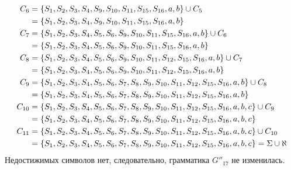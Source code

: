 \begin{itemize}
\begin{align*}
		      C_{6}  & = \left\{S_1, S_2, S_3, S_4, S_9, S_{10}, S_{11}, S_{15}, S_{16}, a, b\right\} \cup C_{5}                                          \\
		             & = \left\{S_1, S_2, S_3, S_4, S_9, S_{10}, S_{11}, S_{15}, S_{16}, a, b\right\}                                                     \\
		      C_{7}  & = \left\{S_1, S_2, S_3, S_4, S_5, S_6, S_9, S_{10}, S_{11}, S_{15}, S_{16}, a, b\right\} \cup C_{6}                                \\
		             & = \left\{S_1, S_2, S_3, S_4, S_5, S_6, S_9, S_{10}, S_{11}, S_{15}, S_{16}, a, b\right\}                                           \\
		      C_{8}  & = \left\{S_1, S_2, S_3, S_4, S_5, S_6, S_9, S_{10}, S_{11}, S_{12}, S_{15}, S_{16}, a, b\right\} \cup C_{7}                        \\
		             & = \left\{S_1, S_2, S_3, S_4, S_5, S_6, S_9, S_{10}, S_{11}, S_{12}, S_{15}, S_{16}, a, b\right\}                                   \\
		      C_{9}  & = \left\{S_1, S_2, S_3, S_4, S_5, S_6, S_7, S_8, S_9, S_{10}, S_{11}, S_{12}, S_{15}, S_{16}, a, b\right\} \cup C_{8}              \\
		             & = \left\{S_1, S_2, S_3, S_4, S_5, S_6, S_7, S_8, S_9, S_{10}, S_{11}, S_{12}, S_{15}, S_{16}, a, b\right\}                         \\
		      C_{10} & = \left\{S_1, S_2, S_3, S_4, S_5, S_6, S_7, S_8, S_9, S_{10}, S_{11}, S_{12}, S_{15}, S_{16}, a, b, c\right\} \cup C_{9}           \\
		             & = \left\{S_1, S_2, S_3, S_4, S_5, S_6, S_7, S_8, S_9, S_{10}, S_{11}, S_{12}, S_{15}, S_{16}, a, b, c\right\}                      \\
		      C_{11} & = \left\{S_1, S_2, S_3, S_4, S_5, S_6, S_7, S_8, S_9, S_{10}, S_{11}, S_{12}, S_{15}, S_{16}, a, b, c\right\} \cup C_{10}          \\
		             & = \left\{S_1, S_2, S_3, S_4, S_5, S_6, S_7, S_8, S_9, S_{10}, S_{11}, S_{12}, S_{15}, S_{16}, a, b, c\right\} = \Sigma \cup \aleph
	      \end{align*}
	      Недостижимых символов нет, следовательно, грамматика \(G''_{17}\) не изменилась.
\end{itemize}
